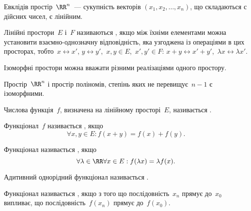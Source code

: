 \begin{example}
Евклідів простір~$\RR^n$~--- сукупність векторів
$(x_1, x_2, \dots, x_n)$, що складаються с дійсних чисел, є лінійним.
\end{example}

\begin{definition}
Лінійні простори~$E$ і~$F$ називаються
, якщо між їхніми елементами можна
установити взаємно-однозначну відповідність, яка
узгоджена із операціями в цих просторах, тобто~$x \leftrightarrow x'$,
$y \leftrightarrow y'$,~$x, y \in E$,~$x', y' \in F$: $x + y \leftrightarrow x' + y'$,~$\lambda x \leftrightarrow \lambda x'$.
\end{definition}

\begin{remark}
Ізоморфні простори можна вважати різними реалізаціями
одного простору.
\end{remark}

\begin{example}
Простір~$\RR^n$ і простір поліномів, степінь яких
не перевищує~$n - 1$ є ізоморфними.
\end{example}

\begin{definition}
Числова функція~$f$, визначена на лінійному
просторі~$E$, називається .
\end{definition}

\begin{definition}
Функціонал~$f$ називається , якщо
\begin{equation*}
    \forall x, y \in E: f(x + y) = f(x) + f (y).
\end{equation*}
\end{definition}

\begin{definition}
Функціонал називається , якщо
\begin{equation*}
    \forall \lambda \in \RR \forall x \in E: f(\lambda x) = \lambda f(x).
\end{equation*}
\end{definition}

\begin{definition}
Адитивний однорідний функціонал називається .
\end{definition}

\begin{definition}
Функціонал називається ,
якщо з того що послідовність~$x_n$ прямує до~$x_0$
випливає, що послідовність~$f(x_n)$ прямує до~$f(x_0)$.
\end{definition}

